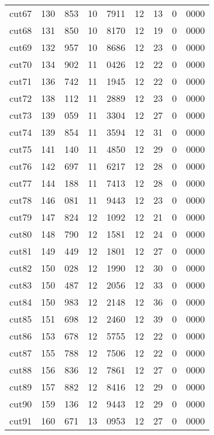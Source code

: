 \documentclass[11pt]{article}
\begin{document}
\begin{center}
\begin{tabular}{lr@{.}lr@{.}lr@{.}lr@{.}l}
cut67 &
  130&853 &
    10&7911 &
      12&13 &
        0&0000 \\
cut68 &
  131&850 &
    10&8170 &
      12&19 &
        0&0000 \\
cut69 &
  132&957 &
    10&8686 &
      12&23 &
        0&0000 \\
cut70 &
  134&902 &
    11&0426 &
      12&22 &
        0&0000 \\
cut71 &
  136&742 &
    11&1945 &
      12&22 &
        0&0000 \\
cut72 &
  138&112 &
    11&2889 &
      12&23 &
        0&0000 \\
cut73 &
  139&059 &
    11&3304 &
      12&27 &
        0&0000 \\
cut74 &
  139&854 &
    11&3594 &
      12&31 &
        0&0000 \\
cut75 &
  141&140 &
    11&4850 &
      12&29 &
        0&0000 \\
cut76 &
  142&697 &
    11&6217 &
      12&28 &
        0&0000 \\
cut77 &
  144&188 &
    11&7413 &
      12&28 &
        0&0000 \\
cut78 &
  146&081 &
    11&9443 &
      12&23 &
        0&0000 \\
cut79 &
  147&824 &
    12&1092 &
      12&21 &
        0&0000 \\
cut80 &
  148&790 &
    12&1581 &
      12&24 &
        0&0000 \\
cut81 &
  149&449 &
    12&1801 &
      12&27 &
        0&0000 \\
cut82 &
  150&028 &
    12&1990 &
      12&30 &
        0&0000 \\
cut83 &
  150&487 &
    12&2056 &
      12&33 &
        0&0000 \\
cut84 &
  150&983 &
    12&2148 &
      12&36 &
        0&0000 \\
cut85 &
  151&698 &
    12&2460 &
      12&39 &
        0&0000 \\
cut86 &
  153&678 &
    12&5755 &
      12&22 &
        0&0000 \\
cut87 &
  155&788 &
    12&7506 &
      12&22 &
        0&0000 \\
cut88 &
  156&836 &
    12&7861 &
      12&27 &
        0&0000 \\
cut89 &
  157&882 &
    12&8416 &
      12&29 &
        0&0000 \\
cut90 &
  159&136 &
    12&9443 &
      12&29 &
        0&0000 \\
cut91 &
  160&671 &
    13&0953 &
      12&27 &
        0&0000 \\

\end{tabular}
\end{center}
\end{document}
